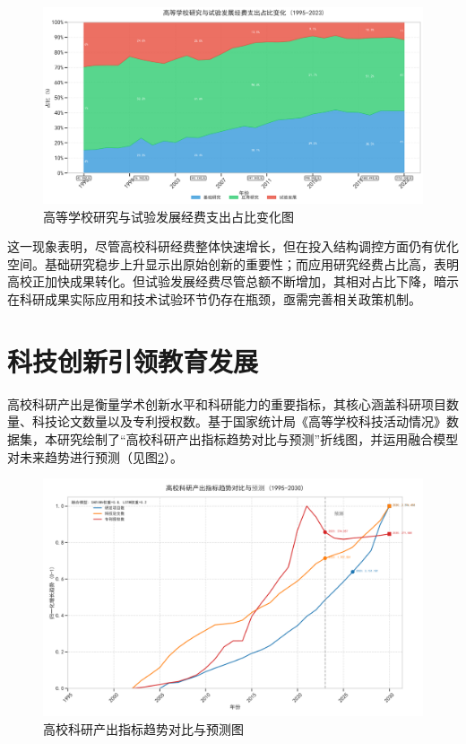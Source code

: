\begin{figure}[H]
    \centering
    \includegraphics[width=0.7\linewidth]{figure/03高等学校研究与试验发展经费支出占比变化.png}
    \caption{高等学校研究与试验发展经费支出占比变化图}
    \label{fig:03高等学校研究与试验发展经费支出占比变化}
\end{figure}

这一现象表明，尽管高校科研经费整体快速增长，但在投入结构调控方面仍有优化空间。基础研究稳步上升显示出原始创新的重要性；而应用研究经费占比高，表明高校正加快成果转化。但试验发展经费尽管总额不断增加，其相对占比下降，暗示在科研成果实际应用和技术试验环节仍存在瓶颈，亟需完善相关政策机制。


\section{科技创新引领教育发展}

高校科研产出是衡量学术创新水平和科研能力的重要指标，其核心涵盖科研项目数量、科技论文数量以及专利授权数。基于国家统计局《高等学校科技活动情况》数据集，本研究绘制了“高校科研产出指标趋势对比与预测”折线图，并运用融合模型对未来趋势进行预测（见图\ref{fig:04高校科研产出指标趋势对比与预测图}）。

\begin{figure}[H]
    \centering
    \includegraphics[width=0.7\linewidth]{figure/04高校科研产出指标趋势对比与预测图.png}
    \caption{高校科研产出指标趋势对比与预测图}
    \label{fig:04高校科研产出指标趋势对比与预测图}
\end{figure}

